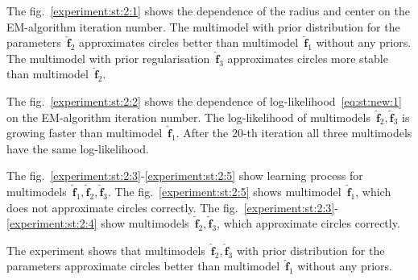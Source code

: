 \documentclass[12pt, twoside]{article}
\numberwithin{equation}{section}
\begin{document}
The fig.~\ref{experiment:st:2:1} shows the dependence of the radius and center on the EM-algorithm iteration number.
The multimodel with prior distribution for the parameters~$\hat{\mathbf{f}}_2$  approximates circles better than multimodel~$\hat{\mathbf{f}}_1$ without any priors.
The multimodel with prior regularisation~$\hat{\mathbf{f}}_3$ approximates circles more stable than multimodel~$\hat{\mathbf{f}}_2$.

The fig.~\ref{experiment:st:2:2} shows the dependence of log-likelihood~\eqref{eq:st:new:1} on the EM-algorithm iteration number.
The log-likelihood of multimodels~$\hat{\mathbf{f}}_2, \hat{\mathbf{f}}_3$ is growing faster than multimodel~$\hat{\mathbf{f}}_1$.  After the $20$-th iteration all three multimodels have the same log-likelihood.

The fig.~\ref{experiment:st:2:3}-\ref{experiment:st:2:5} show learning process for multimodels~$\hat{\mathbf{f}}_1, \hat{\mathbf{f}}_2, \hat{\mathbf{f}}_3$.
The fig.~\ref{experiment:st:2:5} shows multimodel~$\hat{\mathbf{f}}_1$, which does not approximate circles correctly.
The fig.~\ref{experiment:st:2:3}-\ref{experiment:st:2:4} show multimodels~$\hat{\mathbf{f}}_2, \hat{\mathbf{f}}_3$, which approximate circles correctly.

The experiment shows that multimodels~$\hat{\mathbf{f}}_2, \hat{\mathbf{f}}_3$ with prior distribution for the parameters approximate circles better than multimodel~$\hat{\mathbf{f}}_1$ without any priors.
\end{document}
